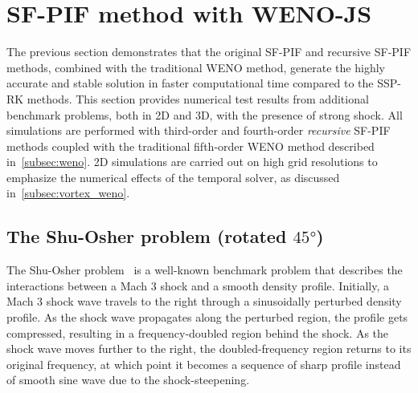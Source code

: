 \section{SF-PIF method with WENO-JS}\label{sec:result_wenojs}

The previous section demonstrates that the original SF-PIF and recursive SF-PIF methods,
combined with the traditional WENO method,
generate the highly accurate and stable solution in faster computational time
compared to the SSP-RK methods.
This section provides numerical test results from additional benchmark problems,
both in 2D and 3D, with the presence of strong shock.
All simulations are performed with third-order and fourth-order \textit{recursive} SF-PIF methods
coupled with the traditional fifth-order WENO method described in~\cref{subsec:weno}.
2D simulations are carried out on high grid resolutions
to emphasize the numerical effects of the temporal solver, as discussed in~\cref{subsec:vortex_weno}.

\subsection{The Shu-Osher problem (rotated \(\ang{45}\))}\label{subsec:shu45_weno}

The Shu-Osher problem~\cite{shu1989efficient} is a well-known benchmark problem
that describes the interactions between a Mach 3 shock and a smooth density profile.
Initially, a Mach 3 shock wave travels to the right through a sinusoidally perturbed
density profile. As the shock wave propagates along the perturbed region,
the profile gets compressed, resulting in a frequency-doubled region behind the shock. 
As the shock wave moves further to the right,
the doubled-frequency region returns to its original frequency, at which point
it becomes a sequence of sharp profile instead of smooth sine wave
due to the shock-steepening.

